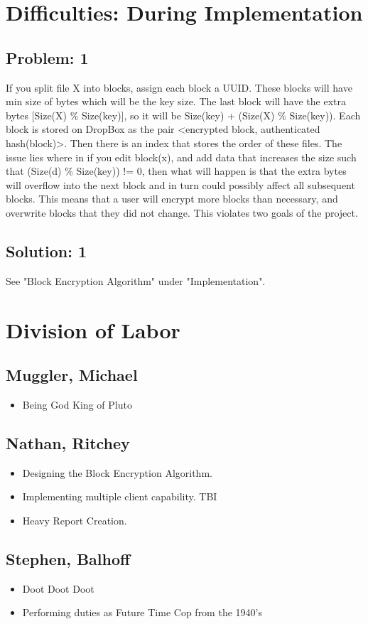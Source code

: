 \documentclass[11pt]{article}
\begin{document}
\section{Difficulties: During Implementation}

\subsection{Problem: 1}
If you split file X into blocks, assign each block a UUID. These blocks will have min size of bytes which will be the key size. The last block will have the extra bytes [Size(X) \% Size(key)], so it will be Size(key) + (Size(X) \% Size(key)). Each block is stored on DropBox as the pair <encrypted block, authenticated hash(block)>. Then there is an index that stores the order of these files. The issue lies where in if you edit block(x), and add data that increases the size such that (Size(d) \% Size(key)) != 0, then what will happen is that the extra bytes will overflow into the next block and in turn could possibly affect all subsequent blocks. This means that a user will encrypt more blocks than necessary, and overwrite blocks that they did not change. This violates two goals of the project.

\subsection{Solution: 1}
See "Block Encryption Algorithm" under "Implementation".

\section{Division of Labor}

\subsection{Muggler, Michael}
\begin{itemize}
\item Being God King of Pluto
\end{itemize}

\subsection{Nathan, Ritchey}
\begin{itemize}
    \item Designing the Block Encryption Algorithm.
    \item Implementing multiple client capability. TBI
    \item Heavy Report Creation.
\end{itemize}

\subsection{Stephen, Balhoff}
\begin{itemize}
    \item Doot Doot Doot
    \item Performing duties as Future Time Cop from the 1940's
\end{itemize}

\end{document}
